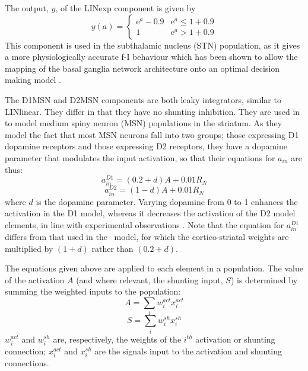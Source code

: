 \documentclass{frontiersSCNS}
\begin{document}
The output, $y$, of the LINexp component is given by
\begin{equation}
   y(a) = \begin{cases}
      \mathrm{e}^{a}-0.9   & \mathrm{e}^a \leq 1+0.9 \\
      1   & \mathrm{e}^a > 1+0.9
   \end{cases}
\end{equation}
This component is used in the subthalamic nucleus (STN) population, as it gives a more
physiologically accurate f-I
behaviour \citep{wilson_model_2004,bevan_mechanisms_1999,hallworth_apamin-sensitive_2003}
which has been shown to allow the mapping of the basal ganglia network
architecture onto an optimal decision making
model \citep{bogacz_basal_2007}.

The D1MSN and D2MSN components are both leaky integrators, similar to
LINlinear. They differ in that they have no shunting inhibition. They
are used in to model medium spiny neuron (MSN) populations in
the striatum. As they model
the fact that most MSN neurons fall into two groups; those expressing D1
dopamine receptors and those expressing D2 receptors, they have a
dopamine parameter that modulates the input activation, so
that their equations for $a_{in}$ are thus:
\begin{equation}
   a_{in}^{D1} = (0.2 + d)A + 0.01 R_N
\end{equation}
\begin{equation}
   a_{in}^{D2} = (1 - d)A + 0.01 R_N
\end{equation}
where $d$ is the dopamine parameter. Varying dopamine from 0 to 1
enhances the activation in the D1 model, whereas it decreases
the activation of the D2 model elements, in line with experimental
observations \citep{harsing_influence_1997,gonon_prolonged_1997}.
Note that the equation for $a_{in}^{D1}$
differs from that used in the \ccg~model, for which the
cortico-striatal weights are multiplied by $(1+d)$ rather than
$(0.2+d)$.

The equations given above are applied to each element in a
population. The value of the activation $A$ (and where relevant, the
shunting input, $S$) is determined by summing the weighted
inputs to the population:
\begin{equation}
A = \sum_{i}w_i^{act} x_i^{act}
\end{equation}
\begin{equation}
S = \sum_{i}w_i^{sh} x_i^{sh}
\end{equation}
$w_i^{act}$ and $w_i^{sh}$ are, respectively, the weights
of the $i^{th}$ activation or shunting connection; $x_i^{act}$
and $x_i^{sh}$ are the signals input to the
activation and shunting connections.
%
%
\end{document}
